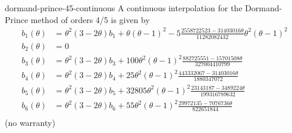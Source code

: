 \begin{Example}{dormand-prince-45-continuous}
  A continuous interpolation for the Dormand-Prince method of orders
  4/5 is given by
  \begin{align*}
    b_1(\theta) &= \theta^2(3-2\theta)b_1 + \theta(\theta-1)^2
    -5\tfrac{2558722523-31403016\theta}{11282082432}\theta^2(\theta-1)^2\\
    b_2(\theta) &= 0 \\
    b_3(\theta) &= \theta^2(3-2\theta)b_3
    + 100\theta^2(\theta-1)^2\tfrac{882725551-15701508\theta}{327004410799}\\
    b_4(\theta) &= \theta^2(3-2\theta)b_4
    + 25\theta^2(\theta-1)^2\tfrac{443332067-31403016\theta}{1880347072}\\
    b_5(\theta) &= \theta^2(3-2\theta)b_5
    + 32805\theta^2(\theta-1)^2\tfrac{23143187-3489224\theta}{199316789632}\\
    b_6(\theta) &= \theta^2(3-2\theta)b_6
    + 55\theta^2(\theta-1)^2\tfrac{29972135-7076736\theta}{822651844}\\
  \end{align*}
  (no warranty)
\end{Example}

